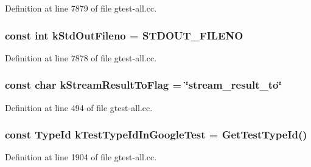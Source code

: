 \-Definition at line 7879 of file gtest-\/all.\-cc.

\hypertarget{namespacetesting_1_1internal_ac5717c0e061ab29ba48cf0929e3f3c8d}{
\subsubsection[{k\-Std\-Out\-Fileno}]{\setlength{\rightskip}{0pt plus 5cm}const int {\bf k\-Std\-Out\-Fileno} = \-S\-T\-D\-O\-U\-T\-\_\-\-F\-I\-L\-E\-N\-O}}\label{d0/da7/namespacetesting_1_1internal_ac5717c0e061ab29ba48cf0929e3f3c8d}


\-Definition at line 7878 of file gtest-\/all.\-cc.

\hypertarget{namespacetesting_1_1internal_a146c6b52bb1400ba13d45c539034af16}{
\subsubsection[{k\-Stream\-Result\-To\-Flag}]{\setlength{\rightskip}{0pt plus 5cm}const char {\bf k\-Stream\-Result\-To\-Flag} = \char`\"{}stream\-\_\-result\-\_\-to\char`\"{}}}\label{d0/da7/namespacetesting_1_1internal_a146c6b52bb1400ba13d45c539034af16}


\-Definition at line 494 of file gtest-\/all.\-cc.

\hypertarget{namespacetesting_1_1internal_a3117ae1f8725f2828385dd7d9fb91ffc}{
\subsubsection[{k\-Test\-Type\-Id\-In\-Google\-Test}]{\setlength{\rightskip}{0pt plus 5cm}const {\bf \-Type\-Id} {\bf k\-Test\-Type\-Id\-In\-Google\-Test} = {\bf \-Get\-Test\-Type\-Id}()}}\label{d0/da7/namespacetesting_1_1internal_a3117ae1f8725f2828385dd7d9fb91ffc}


\-Definition at line 1904 of file gtest-\/all.\-cc.

